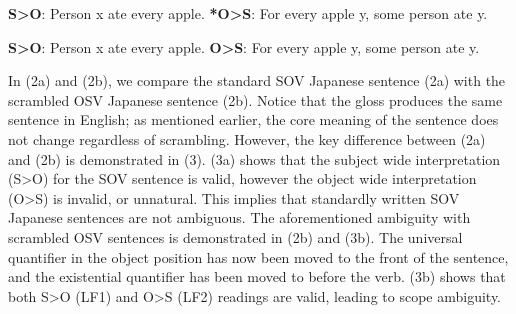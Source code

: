 \documentclass[english, 11pt]{article}
\begin{document}
\begin{exe}
	\ex 
	\begin{xlist}
		\label{1a}
		\label{1b}
	\end{xlist}
\end{exe}
\begin {exe}
	\ex 
		\begin {xlist}
			\ex 
				\begin {xlist}
					\ex \textbf{S>O}: Person x ate every apple.\label{2ai}
					\ex \textbf{*O>S}: For every apple y, some person ate y.\label{2aii}
				\end {xlist}
			\ex
				\begin {xlist} 
					\ex \textbf{S>O}: Person x ate every apple.\label{2bi}
					\ex \textbf{O>S}: For every apple y, some person ate y.\label{2bii}
				\end {xlist}
		\end {xlist}
\end {exe}
In (2a) and (2b), we compare the standard SOV Japanese sentence (2a) with the scrambled OSV Japanese sentence (2b). Notice that the gloss produces the same sentence in English; as mentioned earlier, the core meaning of the sentence does not change regardless of scrambling. However, the key difference between (2a) and (2b) is demonstrated in (3). (3a) shows that the subject wide interpretation (S>O) for the SOV sentence is valid, however the object wide interpretation (O>S) is invalid, or unnatural. This implies that standardly written SOV Japanese sentences are not ambiguous. The aforementioned ambiguity with scrambled OSV sentences is demonstrated in (2b) and (3b). The universal quantifier in the object position has now been moved to the front of the sentence, and the existential quantifier has been moved to before the verb. (3b) shows that both S>O (LF1) and O>S (LF2) readings are valid, leading to scope ambiguity. 
\end{document}
